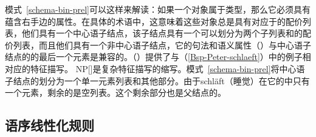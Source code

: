 模式~\ref{schema-bin-prel}可以这样来解读：如果一个对象属于类型，那么它必须具有蕴含右手边的属性。在具体的术语中，这意味着这些对象总是具有对应于的配价列表，他们具有一个中心语子结点，该子结点具有一个可以划分为两个子列表和的配价列表，而且他们具有一个非中心语子结点，它的句法和语义属性（\synsemvc）与中心语子结点的\subcatlc 的最后一个元素是兼容的。（）提供了与（\ref{Bsp-Peter-schlaeft}）中的例子相对应的特征描写。
\ea
{}
\z
NP[]是复杂特征描写的缩写。模式~\ref{schema-bin-prel}将中心语子结点的\subcatlc 划分为一个单一元素列表和其他部分。由于schläft（睡觉）在它的\subcatlc 中只有一个元素，剩余的是空列表。这个剩余部分也是父结点的\subcatvc。

\subsection{语序线性化规则}
\label{Abschnitt-LP-Regeln-HPSG}

